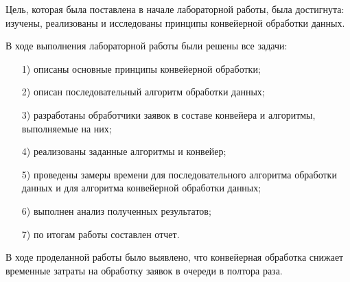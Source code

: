 
Цель, которая была поставлена в начале лабораторной работы, была достигнута: изучены, реализованы и исследованы принципы конвейерной обработки данных.

В ходе выполнения лабораторной работы были решены все задачи:
\begin{enumerate}[itemindent=1.25em]
	\item[1)] описаны основные принципы конвейерной обработки;
\item[2)] описан последовательный алгоритм обработки данных;
\item[3)]
разработаны обработчики заявок в составе конвейера и алгоритмы, выполняемые на них;
\item[4)] реализованы заданные алгоритмы и конвейер;
\item[5)] проведены замеры времени для последовательного алгоритма обработки данных и для алгоритма конвейерной обработки данных;%
\item[6)] выполнен анализ полученных результатов;
\item[7)] по итогам работы составлен отчет.
\end{enumerate}


В ходе проделанной работы было выявлено, что конвейерная обработка снижает временные затраты на обработку заявок в очереди в полтора раза.